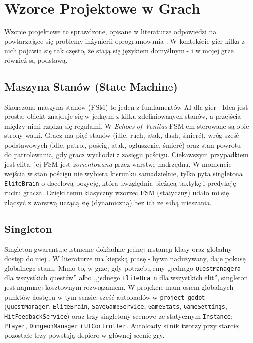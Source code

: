 \section{Wzorce Projektowe w Grach}

Wzorce projektowe to sprawdzone, opisane w literaturze odpowiedzi na powtarzające się problemy inżynierii oprogramowania \cite{gamma1994design}. W kontekście gier kilka z nich pojawia się tak często, że stają się językiem domyślnym - i w mojej grze również są podstawą.

\subsection{Maszyna Stanów (State Machine)}

Skończona maszyna stanów (FSM) to jeden z fundamentów AI dla gier \cite{millington2009ai}. Idea jest prosta: obiekt znajduje się w jednym z kilku zdefiniowanych stanów, a przejścia między nimi rządzą się regułami. W \textit{Echoes of Vanitas} FSM-em sterowane są obie strony walki. Gracz ma pięć stanów (idle, ruch, atak, dash, śmierć), wróg sześć podstawowych (idle, patrol, pościg, atak, ogłuszenie, śmierć) oraz stan powrotu do patrolowania, gdy gracz wychodzi z zasięgu pościgu. Ciekawszym przypadkiem jest elita: jej FSM jest \emph{zorientowana} przez warstwę nadrzędną. W momencie wejścia w stan pościgu nie wybiera kierunku samodzielnie, tylko pyta singletona \texttt{EliteBrain} o docelową pozycję, która uwzględnia bieżącą taktykę i predykcję ruchu gracza. Dzięki temu klasyczny wzorzec FSM (statyczny) udało mi się złączyć z warstwą uczącą się (dynamiczną) bez ich ze sobą mieszania.

\subsection{Singleton}

Singleton gwarantuje istnienie dokładnie jednej instancji klasy oraz globalny dostęp do niej \cite{gamma1994design}. W literaturze ma kiepską prasę - bywa nadużywany, daje pokusę globalnego stanu. Mimo to, w grze, gdy potrzebujemy ,,jednego \texttt{QuestManagera} dla wszystkich questów'' albo ,,jednego \texttt{EliteBrain} dla wszystkich elit'', singleton jest najmniej kosztownym rozwiązaniem. W projekcie mam osiem globalnych punktów dostępu w tym sensie: sześć autoloadów w \texttt{project.godot} (\texttt{QuestManager}, \texttt{EliteBrain}, \texttt{SaveGameService}, \texttt{GameStats}, \texttt{GameSettings}, \texttt{HitFeedbackService}) oraz trzy singletony scenowe ze statycznym \texttt{Instance}: \texttt{Player}, \texttt{DungeonManager} i \texttt{UIController}. Autoloady silnik tworzy przy starcie; pozostałe trzy powstają dopiero w głównej scenie gry.

